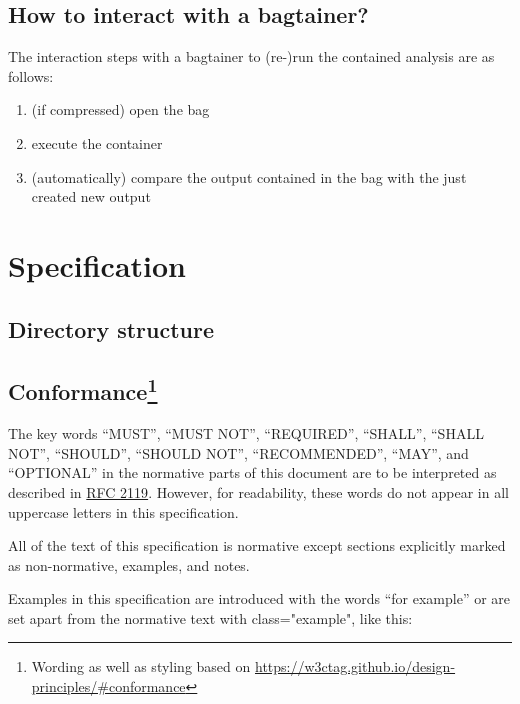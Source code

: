 \documentclass[twoside,a4paper,draft]{refart}
\begin{document}
\subsection{How to interact with a bagtainer?}

The interaction steps with a bagtainer to (re-)run the contained analysis are as follows:

\begin{enumerate}
    \item (if compressed) open the bag
    \item execute the container
    \item (automatically) compare the output contained in the bag with the just created new output
\end{enumerate}


\section{Specification}

\subsection{Directory structure}


\subsection{Conformance\footnote{Wording as well as styling based on \url{https://w3ctag.github.io/design-principles/#conformance}}}

The key words “MUST”, “MUST NOT”, “REQUIRED”, “SHALL”, “SHALL NOT”, “SHOULD”, “SHOULD NOT”, “RECOMMENDED”, “MAY”, and “OPTIONAL” in the normative parts of this document are to be interpreted as described in \href{http://tools.ietf.org/html/rfc2119}{RFC 2119}. However, for readability, these words do not appear in all uppercase letters in this specification.

All of the text of this specification is normative except sections explicitly marked as non-normative, examples, and notes.

Examples in this specification are introduced with the words “for example” or are set apart from the normative text with class="example", like this:
\end{document}
